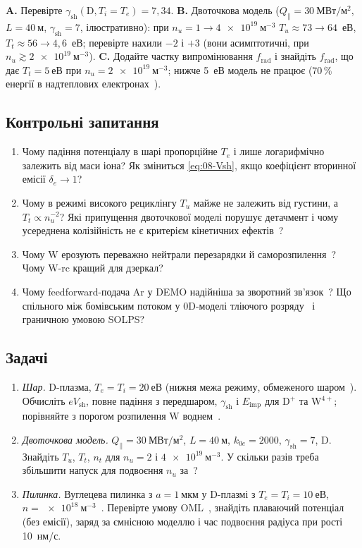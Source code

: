 \begin{practicum}
\textbf{A.} Перевірте $\gamma_{\mathrm{sh}}(\mathrm D,T_i=T_e)=7{,}34$. \textbf{B.} Двоточкова модель ($Q_\parallel=\SI{30}{МВт/м^2}$, $L=\SI{40}{м}$, $\gamma_{\mathrm{sh}}=7$, ілюстративно): при $n_u=1\to\SI{4e19}{м^{-3}}$ $T_u\approx73\to64$~еВ, $T_t\approx56\to4{,}6$~еВ; перевірте нахили $-2$ і $+3$ (вони асимптотичні, при $n_u\gtrsim\SI{2e19}{м^{-3}}$). \textbf{C.} Додайте частку випромінювання $f_{\mathrm{rad}}$ і знайдіть $f_{\mathrm{rad}}$, що дає $T_t=\SI{5}{еВ}$ при $n_u=\SI{2e19}{м^{-3}}$; нижче \SI{5}{еВ} модель не працює (70\,\% енергії в надтеплових електронах~\cite{AhoMantila2011}).
\end{practicum}

\subsection*{Контрольні запитання}
\begin{enumerate}
  \item Чому падіння потенціалу в шарі пропорційне $T_e$ і лише логарифмічно залежить від маси іона? Як зміниться \eqref{eq:08-Vsh}, якщо коефіцієнт вторинної емісії $\delta_e\to1$?
  \item Чому в режимі високого рециклінгу $T_u$ майже не залежить від густини, а $T_t\propto n_u^{-2}$? Які припущення двоточкової моделі порушує детачмент і чому усереднена колізійність не є критерієм кінетичних ефектів~\cite{AhoMantila2011}?
  \item Чому W ерозують переважно нейтрали перезарядки й саморозпилення~\cite{AhoMantila2011,Belyaeva2016}? Чому W-rc кращий для дзеркал?
  \item Чому feedforward-подача Ar у DEMO надійніша за зворотний зв'язок~\cite{Fable2022}? Що спільного між бомівським потоком у 0D-моделі тліючого розряду~\cite{Martsenyuk2025} і граничною умовою SOLPS?
\end{enumerate}

\subsection*{Задачі}
\begin{enumerate}
  \item \emph{Шар.} D-плазма, $T_e=T_i=\SI{20}{еВ}$ (нижня межа режиму, обмеженого шаром~\cite{AhoMantila2011}). Обчисліть $eV_{\mathrm{sh}}$, повне падіння з передшаром, $\gamma_{\mathrm{sh}}$ і $E_{\mathrm{imp}}$ для D$^+$ та W$^{4+}$; порівняйте з порогом розпилення W воднем~\cite{AhoMantila2011}.
  \item \emph{Двоточкова модель.} $Q_\parallel=\SI{30}{МВт/м^2}$, $L=\SI{40}{м}$, $k_{0e}=2000$, $\gamma_{\mathrm{sh}}=7$, D. Знайдіть $T_u$, $T_t$, $n_t$ для $n_u=2$ і $\SI{4e19}{м^{-3}}$. У скільки разів треба збільшити напуск для подвоєння $n_u$ за~\cite{Fable2022}?
  \item \emph{Пилинка.} Вуглецева пилинка з $a=\SI{1}{мкм}$ у D-плазмі з $T_e=T_i=\SI{10}{еВ}$, $n=\SI{e18}{м^{-3}}$~\cite{Pigarov2006}. Перевірте умову OML~\cite{Romashchenko2021}, знайдіть плаваючий потенціал (без емісії), заряд за ємнісною моделлю і час подвоєння радіуса при рості \SI{10}{нм/с}.
\end{enumerate}
